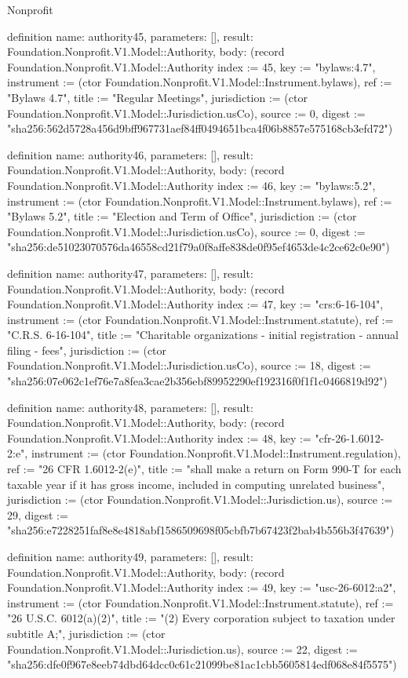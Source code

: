 \begin{lexlean}{Nonprofit}
\begin{semanticmodule}
definition{
  name: authority45,
  parameters: [],
  result: Foundation.Nonprofit.V1.Model::Authority,
  body: (record Foundation.Nonprofit.V1.Model::Authority {index := 45, key := "bylaws:4.7", instrument := (ctor Foundation.Nonprofit.V1.Model::Instrument.bylaws), ref := "Bylaws 4.7", title := "Regular Meetings", jurisdiction := (ctor Foundation.Nonprofit.V1.Model::Jurisdiction.usCo), source := 0, digest := "sha256:562d5728a456d9bff967731aef84ff0494651bca4f06b8857e575168cb3efd72"})
}

definition{
  name: authority46,
  parameters: [],
  result: Foundation.Nonprofit.V1.Model::Authority,
  body: (record Foundation.Nonprofit.V1.Model::Authority {index := 46, key := "bylaws:5.2", instrument := (ctor Foundation.Nonprofit.V1.Model::Instrument.bylaws), ref := "Bylaws 5.2", title := "Election and Term of Office", jurisdiction := (ctor Foundation.Nonprofit.V1.Model::Jurisdiction.usCo), source := 0, digest := "sha256:de51023070576da46558cd21f79a0f8affe838de0f95ef4653de4c2ce62c0e90"})
}

definition{
  name: authority47,
  parameters: [],
  result: Foundation.Nonprofit.V1.Model::Authority,
  body: (record Foundation.Nonprofit.V1.Model::Authority {index := 47, key := "crs:6-16-104", instrument := (ctor Foundation.Nonprofit.V1.Model::Instrument.statute), ref := "C.R.S. 6-16-104", title := "Charitable organizations - initial registration - annual filing - fees", jurisdiction := (ctor Foundation.Nonprofit.V1.Model::Jurisdiction.usCo), source := 18, digest := "sha256:07e062c1ef76e7a8fea3cae2b356ebf89952290ef192316f0f1f1c0466819d92"})
}

definition{
  name: authority48,
  parameters: [],
  result: Foundation.Nonprofit.V1.Model::Authority,
  body: (record Foundation.Nonprofit.V1.Model::Authority {index := 48, key := "cfr-26-1.6012-2:e", instrument := (ctor Foundation.Nonprofit.V1.Model::Instrument.regulation), ref := "26 CFR 1.6012-2(e)", title := "shall make a return on Form 990-T for each taxable year if it has gross income, included in computing unrelated business", jurisdiction := (ctor Foundation.Nonprofit.V1.Model::Jurisdiction.us), source := 29, digest := "sha256:e7228251faf8e8e4818abf1586509698f05cbfb7b67423f2bab4b556b3f47639"})
}

definition{
  name: authority49,
  parameters: [],
  result: Foundation.Nonprofit.V1.Model::Authority,
  body: (record Foundation.Nonprofit.V1.Model::Authority {index := 49, key := "usc-26-6012:a2", instrument := (ctor Foundation.Nonprofit.V1.Model::Instrument.statute), ref := "26 U.S.C. 6012(a)(2)", title := "(2) Every corporation subject to taxation under subtitle A;", jurisdiction := (ctor Foundation.Nonprofit.V1.Model::Jurisdiction.us), source := 22, digest := "sha256:dfe0f967e8eeb74dbd64dcc0c61c21099be81ac1cbb5605814edf068e84f5575"})
}


\end{semanticmodule}
\end{lexlean}
